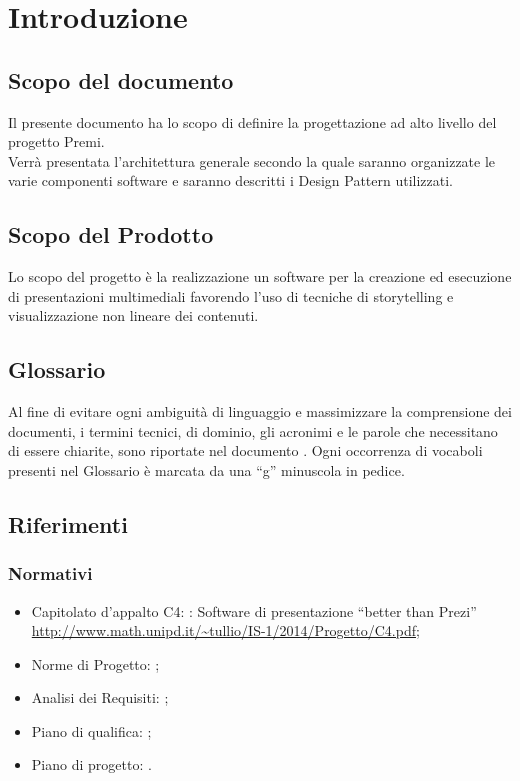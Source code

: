 \section{Introduzione}
\subsection{Scopo del documento}
Il presente documento ha lo scopo di definire la progettazione ad alto livello del progetto Premi.\\
Verrà presentata l'architettura generale secondo la quale saranno organizzate le varie componenti software e saranno descritti i Design Pattern utilizzati.
\subsection{Scopo del Prodotto}
Lo scopo del progetto è la realizzazione un software per la creazione ed esecuzione di presentazioni multimediali favorendo l’uso di tecniche di storytelling e visualizzazione non lineare dei contenuti.
\subsection{Glossario}
Al fine di evitare ogni ambiguità di linguaggio e massimizzare la comprensione dei documenti, i termini tecnici, di dominio, gli acronimi e le parole che necessitano di essere chiarite, sono riportate nel documento \href{run:../../Esterni/\fGlossario}{\fEscapeGlossario}. Ogni occorrenza di vocaboli presenti nel Glossario è marcata da una “g” minuscola in pedice.
\subsection{Riferimenti}

\subsubsection{Normativi}
\begin{itemize}
\item Capitolato d’appalto C4: \premi: Software di presentazione “better than Prezi” \\
\url{http://www.math.unipd.it/~tullio/IS-1/2014/Progetto/C4.pdf};
\item Norme di Progetto: \href{run:../../Interni/\fNormeDiProgetto}{\fEscapeNormeDiProgetto};
\item Analisi dei Requisiti: \href{run:../../Interni/\fAnalisiDeiRequisiti}{\fEscapeAnalisiDeiRequisiti};
\item Piano di qualifica: \href{run:../../Interni/\fPianoDiQualifica}{\fEscapePianoDiQualifica};
\item Piano di progetto: \href{run:../../Interni/\fPianoDiProgetto}{\fEscapePianoDiProgetto}.
\end{itemize}
